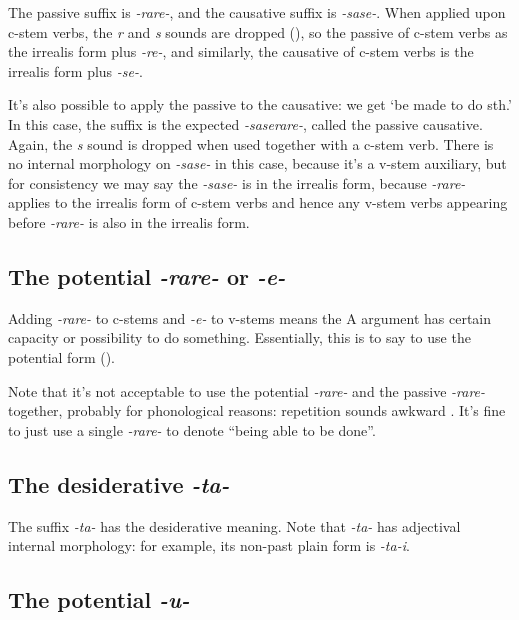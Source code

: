 \documentclass[UTF8, a4paper, oneside, scheme=plain]{ctexrep}
\newcommand{\corpus}[1]{\emph{#1}}
\newcommand{\translate}[1]{`#1'}
\begin{document}
The passive suffix is \corpus{-rare-},
and the causative suffix is \corpus{-sase-}.
When applied upon c-stem verbs,
the \corpus{r} and \corpus{s} sounds are dropped (),
so the passive of c-stem verbs as the irrealis form plus \corpus{-re-},
and similarly,
the causative of c-stem verbs is the irrealis form plus \corpus{-se-}.

It's also possible to apply the passive to the causative:
we get \translate{be made to do sth.}
In this case, the suffix is the expected 
\corpus{-saserare-},
called the passive causative.
Again, the \corpus{s} sound is dropped when used together with a c-stem verb.
There is no internal morphology on \corpus{-sase-} in this case,
because it's a v-stem auxiliary, but for consistency we may say
the \corpus{-sase-} is in the irrealis form,
because \corpus{-rare-} applies to the irrealis form of c-stem verbs 
and hence any v-stem verbs appearing before \corpus{-rare-} is also in the irrealis form.

\subsection{The potential \corpus{-rare-} or \corpus{-e-}}\label{sec:be-able-to-do}

Adding \corpus{-rare-} to c-stems and \corpus{-e-} to v-stems 
means the A argument has certain capacity or possibility to do something.
Essentially, this is to say to use the potential form ().

Note that it's not acceptable to use the potential \corpus{-rare-} and the passive \corpus{-rare-} together,
probably for phonological reasons: repetition sounds awkward \citep{kuno1978japanese}.
It's fine to just use a single \corpus{-rare-} to denote ``being able to be done''.

\subsection{The desiderative \corpus{-ta-}}

The suffix \corpus{-ta-} has the desiderative meaning.
Note that \corpus{-ta-} has adjectival internal morphology:
for example, its non-past plain form is \corpus{-ta-i}.

\subsection{The potential \corpus{-u-}}
\end{document}
